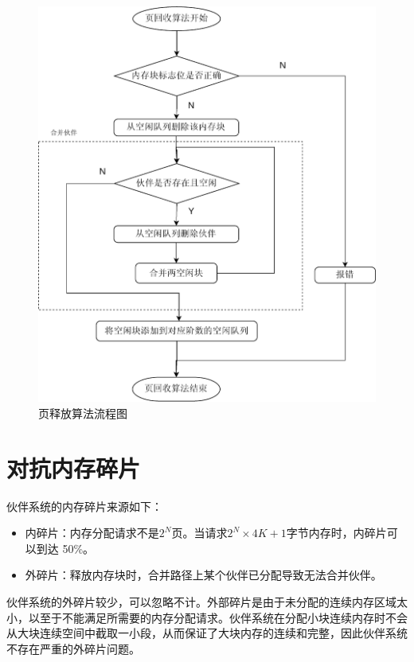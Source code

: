 \documentclass[AutoFakeBold]{LZUThesis}
\begin{document}
\begin{sloppypar}
\begin{figure}[H]
\centering
\includegraphics[]{images/page-deallocate-flowchart.drawio.pdf}
\caption{页释放算法流程图}
\label{figure:page-deallocate-flowchart}
\end{figure}


\section{对抗内存碎片}

伙伴系统的内存碎片来源如下：

\begin{itemize}
\item
  内碎片：内存分配请求不是\(2^N\)页。当请求$2^{N}\times 4K+1$字节内存时，内碎片可以到达 50\%。
\item
  外碎片：释放内存块时，合并路径上某个伙伴已分配导致无法合并伙伴。
\end{itemize}

伙伴系统的外碎片较少，可以忽略不计。外部碎片是由于未分配的连续内存区域太小，以至于不能满足所需要的内存分配请求。伙伴系统在分配小块连续内存时不会从大块连续空间中截取一小段，从而保证了大块内存的连续和完整，因此伙伴系统不存在严重的外碎片问题。


\end{sloppypar}
\end{document}
